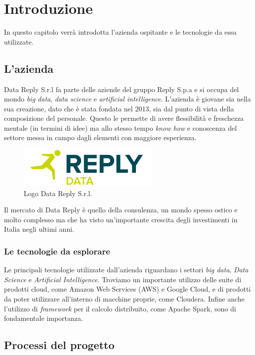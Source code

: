 \chapter{Introduzione}
\label{ch:Introduzione}
In questo capitolo verrà introdotta l'azienda ospitante e le tecnologie da essa utilizzate.
\section{L'azienda}
Data Reply S.r.l fa parte delle aziende del gruppo Reply S.p.a e si occupa del mondo \emph{big data}, \emph{data science} e \emph{artificial intelligence}. L'azienda è giovane sia nella sua creazione, dato che è stata fondata nel 2013, sia dal punto di vista della composizione del personale. Questo le permette di avere flessibilità e freschezza mentale (in termini di idee) ma allo stesso tempo \emph{know how} e conoscenza del settore messa in campo dagli elementi con maggiore esperienza.

\begin{figure}
	\centering
	\includegraphics[scale=2]{figures/data-reply-logo}
	\caption[Logo Data Reply S.r.l.]{Logo Data Reply S.r.l.
		\label{fig:logoDataReply}}
\end{figure}

Il mercato di Data Reply è quello della consulenza, un mondo spesso ostico e molto complesso ma che ha visto un'importante crescita degli investimenti in Italia negli ultimi anni.
\subsection{Le tecnologie da esplorare}
Le principali tecnologie utilizzate dall'azienda riguardano i settori \emph{big data}, \emph{Data Science} e \emph{Artificial Intelligence}. Troviamo un importante utilizzo delle suite di prodotti cloud, come Amazon Web Services (AWS) e Google Cloud, e di prodotti da poter utilizzare all'interno di macchine proprie, come \Gls{Cloudera}. Infine anche l'utilizzo di \emph{framework} per il calcolo distribuito, come Apache Spark, sono di fondamentale importanza.
\section{Processi del progetto}
